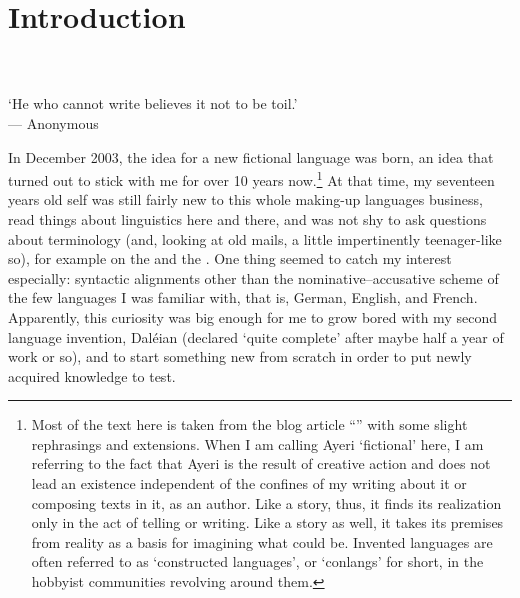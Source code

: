 \setcounter{chapter}{-1}
\chapter{Introduction}
\label{ch:introduction}

\begin{minipage}{\linewidth}\raggedleft\smaller
{}\\
\\
`He who cannot write believes it not to be toil.'\\
--- Anonymous\footnotemark
\end{minipage}\bigskip\bigskip


\noindent In December 2003, the idea for a new fictional language was born, an
idea that turned out to stick with me for over 10 years now.\footnote{Most of
the text here is taken from the blog article
``'' \parencite{benung:happybirthday} with some
slight rephrasings and extensions. When I am calling Ayeri `fictional' here, I
am referring to the fact that Ayeri is the result of creative action and does
not lead an existence independent of the confines of my writing about it or
composing texts in it, as an author. Like a story, thus, it finds its
realization only in the act of telling or writing. Like a story as well, it
takes its premises from reality as a basis for imagining what could be. Invented
languages are often referred to as `constructed languages', or `conlangs' for
short, in the hobbyist communities revolving around them.} At that time, my
seventeen years old self was still fairly new to this whole making-up languages
business, read things about linguistics here and there, and was not shy to ask
questions about terminology (and, looking at old mails, a little impertinently
teenager-like so), for example on the \citetitle*{conlangl} and the
\citetitle*{zbb}. One thing seemed to catch my interest especially: syntactic
alignments other than the nominative--accusative scheme of the few languages I
was familiar with, that is, German, English, and French. Apparently, this
curiosity was big enough for me to grow bored with my second language invention,
Daléian (declared `quite complete' after maybe half a year of work or so), and
to start something new from scratch in order to put newly acquired knowledge to
test.


